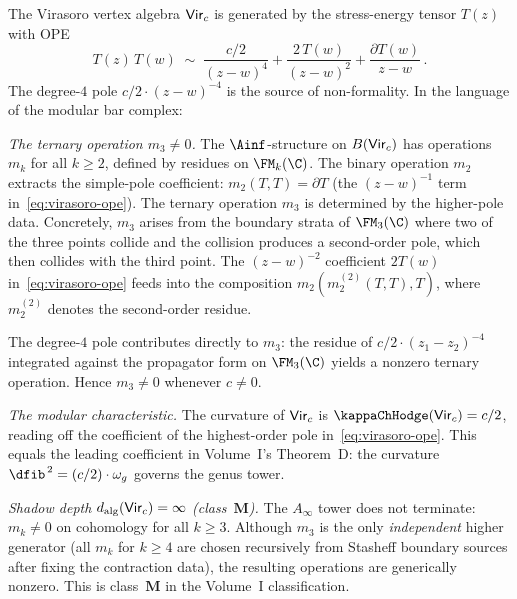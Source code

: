 \begin{example}
\label{ex:virasoro-nonformality}
The Virasoro vertex algebra $\mathsf{Vir}_c$ is generated by the
stress-energy tensor $T(z)$ with OPE
\begin{equation}\label{eq:virasoro-ope}
 T(z)\, T(w) \;\sim\;
 \frac{c/2}{(z-w)^4}
 + \frac{2\, T(w)}{(z-w)^2}
 + \frac{\partial T(w)}{z-w}\,.
\end{equation}
The degree-$4$ pole $c/2 \cdot (z-w)^{-4}$ is the source of
non-formality. In the language of the modular bar complex:

\medskip\noindent
\emph{The ternary operation $m_3 \neq 0$.}
The $\Ainf$-structure on $B(\mathsf{Vir}_c)$ has operations
$m_k$ for all $k \ge 2$, defined by residues on $\FM_k(\C)$.
The binary operation $m_2$ extracts the simple-pole
coefficient: $m_2(T, T) = \partial T$ (the $(z-w)^{-1}$ term
in~\eqref{eq:virasoro-ope}).
The ternary operation $m_3$ is determined by the
higher-pole data. Concretely, $m_3$ arises from the boundary
strata of $\FM_3(\C)$ where two of the three points collide
and the collision produces a second-order pole, which then
collides with the third point. The $(z-w)^{-2}$ coefficient
$2T(w)$ in~\eqref{eq:virasoro-ope} feeds into the composition
$m_2(m_2^{(2)}(T, T), T)$, where $m_2^{(2)}$ denotes the
second-order residue.

The degree-$4$ pole contributes directly to $m_3$: the residue
of $c/2 \cdot (z_1 - z_2)^{-4}$ integrated against the
propagator form on $\FM_3(\C)$ yields a nonzero ternary
operation. Hence $m_3 \neq 0$ whenever $c \neq 0$.

\medskip\noindent
\emph{The modular characteristic.}
The curvature of $\mathsf{Vir}_c$ is
$\kappaChHodge(\Vir_c) = c/2$,
reading off the coefficient of the highest-order pole
in~\eqref{eq:virasoro-ope}.
This equals the leading coefficient in Volume~I's
Theorem~D: the curvature $\dfib^{\,2} = (c/2) \cdot \omega_g$
governs the genus tower.

\medskip\noindent
\emph{Shadow depth $d_{\mathrm{alg}}(\mathsf{Vir}_c) = \infty$ (class~$\mathbf{M}$).}
The $A_\infty$ tower does not terminate: $m_k \neq 0$ on
cohomology for all $k \ge 3$. Although $m_3$ is the
only \emph{independent} higher generator (all $m_k$ for
$k \ge 4$ are chosen recursively from Stasheff boundary sources after
fixing the contraction data), the resulting operations are generically
nonzero. This is class~$\mathbf{M}$ in the Volume~I
classification.
\end{example}

